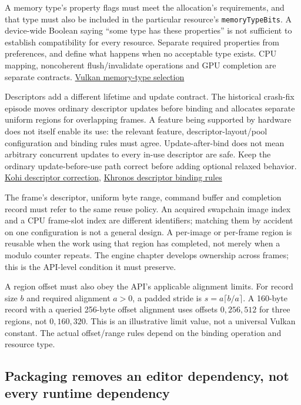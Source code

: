 A memory type's property flags must meet the allocation's requirements, and that type must also be included in the particular resource's \texttt{memoryTypeBits}. A device-wide Boolean saying ``some type has these properties'' is not sufficient to establish compatibility for every resource. Separate required properties from preferences, and define what happens when no acceptable type exists. CPU mapping, noncoherent flush/invalidate operations and GPU completion are separate contracts. \href{https://docs.vulkan.org/spec/latest/chapters/memory.html}{Vulkan memory-type selection}

Descriptors add a different lifetime and update contract. The historical crash-fix episode moves ordinary descriptor updates before binding and allocates separate uniform regions for overlapping frames. A feature being supported by hardware does not itself enable its use: the relevant feature, descriptor-layout/pool configuration and binding rules must agree. Update-after-bind does not mean arbitrary concurrent updates to every in-use descriptor are safe. Keep the ordinary update-before-use path correct before adding optional relaxed behavior. \href{https://www.youtube.com/watch?v=U4QvUeUL37Y}{Kohi descriptor correction}, \href{https://docs.vulkan.org/spec/latest/chapters/descriptorsets.html}{Khronos descriptor binding rules}

The frame's descriptor, uniform byte range, command buffer and completion record must refer to the same reuse policy. An acquired swapchain image index and a CPU frame-slot index are different identifiers; matching them by accident on one configuration is not a general design. A per-image or per-frame region is reusable when the work using that region has completed, not merely when a modulo counter repeats. The engine chapter develops ownership across frames; this is the API-level condition it must preserve.

A region offset must also obey the API's applicable alignment limits. For record size \(b\) and required alignment \(a>0\), a padded stride is \(s=a\lceil b/a\rceil\). A 160-byte record with a queried 256-byte offset alignment uses offsets \(0,256,512\) for three regions, not \(0,160,320\). This is an illustrative limit value, not a universal Vulkan constant. The actual offset/range rules depend on the binding operation and resource type.

\subsection{Packaging removes an editor dependency, not every runtime dependency}\label{05-engine-i-ch008-packaging-removes-an-editor-dependency-not-every-runtime-dependency}

